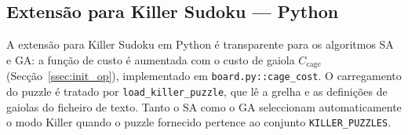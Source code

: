 \subsection{Extensão para Killer Sudoku — Python}
\label{ssec:killer_python}

A extensão para Killer Sudoku em Python é transparente para os algoritmos SA e GA: a função de custo é aumentada com o custo de gaiola $C_{\text{cage}}$ (Secção~\ref{ssec:init_op}), implementado em \texttt{board.py::cage\_cost}. O carregamento do puzzle é tratado por \texttt{load\_killer\_puzzle}, que lê a grelha e as definições de gaiolas do ficheiro de texto. Tanto o SA como o GA seleccionam automaticamente o modo Killer quando o puzzle fornecido pertence ao conjunto \texttt{KILLER\_PUZZLES}.
